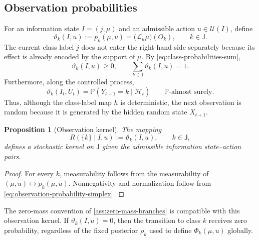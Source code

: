 \documentclass[10pt,twocolumn]{article}
\newtheorem{proposition}{Proposition}
\theoremstyle{remark}
\newcommand{\Pp}{\mathbb{P}}
\newcommand{\Hh}{\mathcal{H}}
\newcommand{\Ucal}{\mathcal{U}}
\begin{document}
\subsection{Observation probabilities}
\label{subsec:information-observation-probabilities}

For an information state $I=(j,\mu)$ and an admissible action $u\in\Ucal(I)$, define
\begin{equation}
	\vartheta_k(I,u)
	:=p_k(\mu,u)
	=\bigl(\mathcal L_u\mu\bigr)(O_k),
	\qquad k\in\mathsf J.
	\label{eq:information-observation-probability}
\end{equation}
The current class label $j$ does not enter the right-hand side separately because its effect is already encoded by the support of $\mu$. By \cref{eq:class-probabilities-sum},
\begin{equation*}
	\vartheta_k(I,u)\geq0,
	\qquad
	\sum_{k\in\mathsf J}\vartheta_k(I,u)=1.
	\label{eq:observation-probability-simplex}
\end{equation*}
Furthermore, along the controlled process,
\begin{equation}
	\vartheta_k(I_t,U_t)
	=\Pp(Y_{t+1}=k\mid\Hh_t)
	\qquad \Pp\text{-almost surely}.
	\label{eq:observation-probability-history}
\end{equation}
Thus, although the class-label map $h$ is deterministic, the next observation is random because it is generated by the hidden random state $X_{t+1}$.

\begin{proposition}[Observation kernel]
	\label{prop:observation-kernel-information}
	The mapping
	\begin{equation}
		R(\{k\}\mid I,u)
		:=\vartheta_k(I,u),
		\qquad k\in\mathsf J,
		\label{eq:observation-kernel}
	\end{equation}
	defines a stochastic kernel on $\mathsf J$ given the admissible information state--action pairs.
\end{proposition}

\begin{proof}
	For every $k$, measurability follows from the measurability of $(\mu,u)\mapsto p_k(\mu,u)$. Nonnegativity and normalization follow from \cref{eq:observation-probability-simplex}.
\end{proof}

The zero-mass convention of \cref{ass:zero-mass-branches} is compatible with this observation kernel. If $\vartheta_k(I,u)=0$, then the transition to class $k$ receives zero probability, regardless of the fixed posterior $\rho_k$ used to define $\Phi_k(\mu,u)$ globally.
\end{document}
